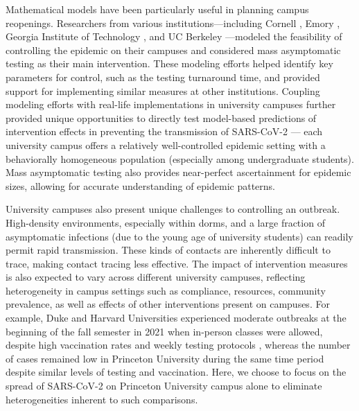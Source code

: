 \documentclass[12pt]{article}
\begin{document}
Mathematical models have been particularly useful in planning campus reopenings.
Researchers from various institutions---including Cornell \citep{frazier2022modeling}, Emory \citep{lopman2020model}, Georgia Institute of Technology \citep{gibson2021surveillance}, and UC Berkeley \citep{brook2021optimizing}---modeled the feasibility of controlling the epidemic on their campuses and considered mass asymptomatic testing as their main intervention.
These modeling efforts helped identify key parameters for control, such as the testing turnaround time, and provided support for implementing similar measures at other institutions.
Coupling modeling efforts with real-life implementations in university campuses further provided unique opportunities to directly test model-based predictions of intervention effects in preventing the transmission of SARS-CoV-2 \citep{frazier2022modeling}---
each university campus offers a relatively well-controlled epidemic setting with a behaviorally homogeneous population (especially among undergraduate students).
Mass asymptomatic testing also provides near-perfect ascertainment for epidemic sizes, allowing for accurate understanding of epidemic patterns.

University campuses also present unique challenges to controlling an outbreak.
High-density environments, especially within dorms, and a large fraction of asymptomatic infections (due to the young age of university students) can readily permit rapid transmission.
These kinds of contacts are inherently difficult to trace, making contact tracing less effective.
The impact of intervention measures is also expected to vary across different university campuses, reflecting heterogeneity in campus settings such as compliance, resources, community prevalence, as well as effects of other interventions present on campuses.
For example, Duke and Harvard Universities experienced moderate outbreaks at the beginning of the fall semester in 2021 when in-person classes were allowed, despite high vaccination rates and weekly testing protocols \citep{dukeoutbreak,harvardoutbreak}, whereas the number of cases remained low in Princeton University during the same time period despite similar levels of testing and vaccination.
Here, we choose to focus on the spread of SARS-CoV-2 on Princeton University campus alone to eliminate heterogeneities inherent to such comparisons.
\end{document}
